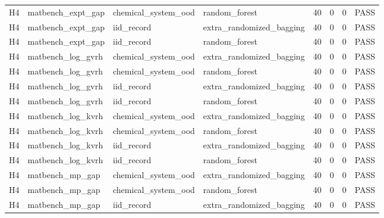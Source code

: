 \documentclass[10pt]{article}
\begin{document}
\begin{landscape}
\begin{longtable}{L{.32in}L{1.05in}L{1.2in}L{1.3in}L{.42in}L{.42in}L{.42in}L{.48in}}
H4 & matbench\_\allowbreak{}expt\_\allowbreak{}gap & chemical\_\allowbreak{}system\_\allowbreak{}ood & random\_\allowbreak{}forest & 40 & 0 & 0 & PASS\\
H4 & matbench\_\allowbreak{}expt\_\allowbreak{}gap & iid\_\allowbreak{}record & extra\_\allowbreak{}randomized\_\allowbreak{}bagging & 40 & 0 & 0 & PASS\\
H4 & matbench\_\allowbreak{}expt\_\allowbreak{}gap & iid\_\allowbreak{}record & random\_\allowbreak{}forest & 40 & 0 & 0 & PASS\\
H4 & matbench\_\allowbreak{}log\_\allowbreak{}gvrh & chemical\_\allowbreak{}system\_\allowbreak{}ood & extra\_\allowbreak{}randomized\_\allowbreak{}bagging & 40 & 0 & 0 & PASS\\
H4 & matbench\_\allowbreak{}log\_\allowbreak{}gvrh & chemical\_\allowbreak{}system\_\allowbreak{}ood & random\_\allowbreak{}forest & 40 & 0 & 0 & PASS\\
H4 & matbench\_\allowbreak{}log\_\allowbreak{}gvrh & iid\_\allowbreak{}record & extra\_\allowbreak{}randomized\_\allowbreak{}bagging & 40 & 0 & 0 & PASS\\
H4 & matbench\_\allowbreak{}log\_\allowbreak{}gvrh & iid\_\allowbreak{}record & random\_\allowbreak{}forest & 40 & 0 & 0 & PASS\\
H4 & matbench\_\allowbreak{}log\_\allowbreak{}kvrh & chemical\_\allowbreak{}system\_\allowbreak{}ood & extra\_\allowbreak{}randomized\_\allowbreak{}bagging & 40 & 0 & 0 & PASS\\
H4 & matbench\_\allowbreak{}log\_\allowbreak{}kvrh & chemical\_\allowbreak{}system\_\allowbreak{}ood & random\_\allowbreak{}forest & 40 & 0 & 0 & PASS\\
H4 & matbench\_\allowbreak{}log\_\allowbreak{}kvrh & iid\_\allowbreak{}record & extra\_\allowbreak{}randomized\_\allowbreak{}bagging & 40 & 0 & 0 & PASS\\
H4 & matbench\_\allowbreak{}log\_\allowbreak{}kvrh & iid\_\allowbreak{}record & random\_\allowbreak{}forest & 40 & 0 & 0 & PASS\\
H4 & matbench\_\allowbreak{}mp\_\allowbreak{}gap & chemical\_\allowbreak{}system\_\allowbreak{}ood & extra\_\allowbreak{}randomized\_\allowbreak{}bagging & 40 & 0 & 0 & PASS\\
H4 & matbench\_\allowbreak{}mp\_\allowbreak{}gap & chemical\_\allowbreak{}system\_\allowbreak{}ood & random\_\allowbreak{}forest & 40 & 0 & 0 & PASS\\
H4 & matbench\_\allowbreak{}mp\_\allowbreak{}gap & iid\_\allowbreak{}record & extra\_\allowbreak{}randomized\_\allowbreak{}bagging & 40 & 0 & 0 & PASS\\

\end{longtable}
\end{landscape}
\end{document}
